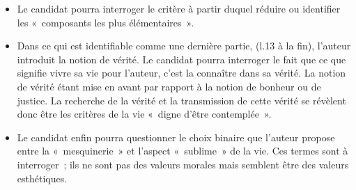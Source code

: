 {\begin{itemize}[label=\textbullet]
mettre en évidence la contradiction entre le désir de «~vivre à fond~» et le travail de
réduction auquel ce désir est associé. Contradiction entre le fait de vivre à fond – qui
pourrait être compris comme un désir de volupté – et une pensée de la réduction et du
combat~: «~résolution spartiate~», «~mis en déroute~», «~tondre ras~», «~acculer~»,
«~réduire~»…
\item Le candidat pourra interroger le critère à partir duquel réduire ou identifier les
«~composants les plus élémentaires~».
\item Dans ce qui est identifiable comme une dernière partie, (l.13 à la fin), l'auteur introduit la
notion de vérité. Le candidat pourra interroger le fait que ce que signifie vivre sa vie pour
l'auteur, c'est la connaître dans sa vérité. La notion de vérité étant mise en avant par
rapport à la notion de bonheur ou de justice. La recherche de la vérité et la transmission
de cette vérité se révèlent donc être les critères de la vie «~digne d'être contemplée~».
\item Le candidat enfin pourra questionner le choix binaire que l'auteur propose entre la
«~mesquinerie~» et l'aspect «~sublime~» de la vie. Ces termes sont à interroger~; ils ne sont
pas des valeurs morales mais semblent être des valeurs esthétiques.
\end{itemize}}%
